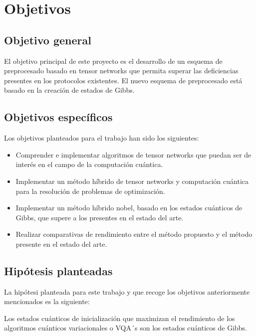 \chapter{Objetivos}

\section{Objetivo general}

El objetivo principal de este proyecto es el desarrollo de un esquema de preprocesado basado en tensor networks que permita superar las deficiencias presentes en los protocolos existentes. El nuevo esquema de preprocesado está basado en la creación de estados de Gibbs.

\section{Objetivos específicos}

Los objetivos planteados para el trabajo han sido los siguientes:

\begin{itemize}
    
    \item Comprender e implementar algoritmos de tensor networks que puedan ser de interés en el campo de la computación cuántica.
    
    \item Implementar un método híbrido de tensor networks y computación cuántica para la resolución de problemas de optimización.
   
    \item Implementar un método híbrido nobel, basado en los estados cuánticos de Gibbs, que supere a los presentes en el estado del arte.
     
    \item Realizar comparativas de rendimiento entre el método propuesto y el método presente en el estado del arte.

\end{itemize}

\section{Hipótesis planteadas}

La hipótesi planteada para este trabajo y que recoge los objetivos anteriormente mencionados es la siguiente:\\

\begin{mdframed}[backgroundcolor=black!10]
\centering 

Los estados cuánticos de inicialización que maximizan el rendimiento de los algoritmos cuánticos variacionales o VQA´s son los estados cuánticos de Gibbs. 

\end{mdframed}